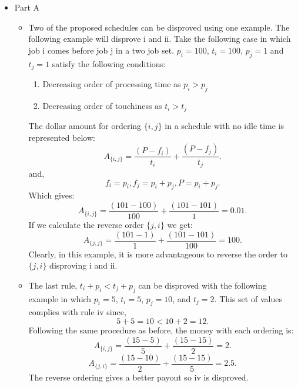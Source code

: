 \documentclass[letterpaper,11pt]{article}
\begin{document}
\begin{enumerate}
  
  \begin{itemize}
      \color{teal}
      \item Part A
  \begin{itemize}
      \item Two of the proposed schedules can be disproved using one example.
           The following example will disprove i and ii. 
          Take the following case in which job i comes before job j in a two
          job set. $p_i = 100$,  $t_i = 100$, $p_j = 1$ and $t_j = 1$ satisfy 
          the following conditions:
          \begin{enumerate}[i]
              \item Decreasing order of processing time as $p_i > p_j$
              \item Decreasing order of touchiness as $t_i > t_j$
          \end{enumerate}
          The dollar amount for ordering $\{i, j\} $ in a schedule with no idle 
          time is represented below:
          \[
              A_{\{i, j\} } = \frac{\left( P - f_i \right) }{t_i} + \frac{\left( P - f_j \right) }{t_j}
          .\] 
          and, 
          \[
          f_i = p_i, f_j = p_i + p_j, P = p_i + p_j
          .\] 
          Which gives:
          \[
              A_{\{i, j\} } = \frac{\left( 101 - 100 \right) }{100} + \frac{\left( 101 - 101 \right) }{1} = 0.01
          .\] 
          If we calculate the reverse order $\{j, i\} $ we get:
          \[
              A_{\{j, j\} } = \frac{\left( 101-1 \right) }{1} + \frac{\left( 101 - 101 \right) }{100} = 100
          .\] 
          Clearly, in this example, it is more advantageous to reverse the order
          to $\{j, i\} $ disproving i and ii.
      \item The last rule, $t_i + p_i < t_j + p_j$ can be disproved with the 
          following example in which $p_i = 5$,  $t_i = 5$, $p_j = 10$, and $t_j = 2$. This set of values complies with rule iv since,
          \[
          5 + 5 = 10 < 10 + 2 = 12
          .\] 
          Following the same procedure as before, the money with each ordering 
          is:
          \[
              A_{\{i, j\} } = \frac{\left( 15 - 5 \right) }{5} + \frac{\left( 15 - 15 \right) }{2} = 2
          .\] 
          \[
              A_{\{j, i\} } = \frac{\left( 15 - 10 \right) }{2} + \frac{\left( 15 -15 \right) }{5} = 2.5
          .\] 
          The reverse ordering gives a better payout so iv is disproved.

  \end{itemize}


\end{itemize}
\end{enumerate}
\end{document}
